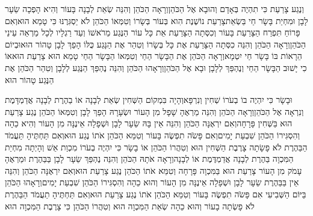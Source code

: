 \documentclass[../main/main.tex]{subfiles}
\begin{document}
\begin{multicols*}{\ncols}
וְנֶגַע\SubEnd{} צָרַעַת כִּי תִהְיֶה בְּאָדָם וְהוּבָא אֶל הַכֹּהֵן\PreVerseSpace{}וְרָאָה הַכֹּהֵן וְהִנֵּה שְׂאֵת לְבָנָה בָּעוֹר וְהִיא הָפְכָה שֵׂעָר לָבָן וּמִחְיַת בָּשָׂר חַי בַּשְׂאֵת\PreVerseSpace{}צָרַעַת נוֹשֶׁנֶת הִוא בְּעוֹר בְּשָׂרוֹ וְטִמְּאוֹ הַכֹּהֵן לֹא יַסְגִּרֶנּוּ כִּי טָמֵא הוּא\PreVerseSpace{}וְאִם פָּרוֹחַ תִּפְרַח הַצָּרַעַת בָּעוֹר וְכִסְּתָה הַצָּרַעַת אֵת כָּל עוֹר הַנֶּגַע מֵרֹאשׁוֹ וְעַד רַגְלָיו לְכָל מַרְאֵה עֵינֵי הַכֹּהֵן\PreVerseSpace{}וְרָאָה הַכֹּהֵן וְהִנֵּה כִסְּתָה הַצָּרַעַת אֶת כָּל בְּשָׂרוֹ וְטִהַר אֶת הַנָּגַע כֻּלּוֹ הָפַךְ לָבָן טָהוֹר הוּא\PreVerseSpace{}וּבְיוֹם הֵרָאוֹת בּוֹ בָּשָׂר חַי יִטְמָא\PreVerseSpace{}וְרָאָה הַכֹּהֵן אֶת הַבָּשָׂר הַחַי וְטִמְּאוֹ הַבָּשָׂר הַחַי טָמֵא הוּא צָרַעַת הוּא\PreVerseSpace{}אוֹ כִי יָשׁוּב הַבָּשָׂר הַחַי וְנֶהְפַּךְ לְלָבָן וּבָא אֶל הַכֹּהֵן\PreVerseSpace{}וְרָאָהוּ הַכֹּהֵן וְהִנֵּה נֶהְפַּךְ הַנֶּגַע לְלָבָן וְטִהַר הַכֹּהֵן אֶת הַנֶּגַע טָהוֹר הוּא\OpenSection{}\par
{}וּבָשָׂר כִּי יִהְיֶה בוֹ בְעֹרוֹ שְׁחִין וְנִרְפָּא\PreVerseSpace{}וְהָיָה בִּמְקוֹם הַשְּׁחִין שְׂאֵת לְבָנָה אוֹ בַהֶרֶת לְבָנָה אֲדַמְדָּמֶת וְנִרְאָה אֶל הַכֹּהֵן\PreVerseSpace{}וְרָאָה הַכֹּהֵן וְהִנֵּה מַרְאֶהָ שָׁפָל מִן הָעוֹר וּשְׂעָרָהּ הָפַךְ לָבָן וְטִמְּאוֹ הַכֹּהֵן נֶגַע צָרַעַת הוּא בַּשְּׁחִין פָּרָחָה\PreVerseSpace{}וְאִם יִרְאֶנָּה הַכֹּהֵן וְהִנֵּה אֵין בָּהּ שֵׂעָר לָבָן וּשְׁפָלָה אֵינֶנָּה מִן הָעוֹר וְהִיא כֵהָה וְהִסְגִּירוֹ הַכֹּהֵן שִׁבְעַת יָמִים\PreVerseSpace{}וְאִם פָּשֹׂה תִפְשֶׂה בָּעוֹר וְטִמֵּא הַכֹּהֵן אֹתוֹ נֶגַע הוּא\PreVerseSpace{}וְאִם תַּחְתֶּיהָ תַּעֲמֹד הַבַּהֶרֶת לֹא פָשָׂתָה צָרֶבֶת הַשְּׁחִין הוּא וְטִהֲרוֹ הַכֹּהֵן \ClosedSection{}אוֹ בָשָׂר כִּי יִהְיֶה בְעֹרוֹ מִכְוַת אֵשׁ וְהָיְתָה מִחְיַת הַמִּכְוָה בַּהֶרֶת לְבָנָה אֲדַמְדֶּמֶת אוֹ לְבָנָה\PreVerseSpace{}וְרָאָה אֹתָהּ הַכֹּהֵן וְהִנֵּה נֶהְפַּךְ שֵׂעָר לָבָן בַּבַּהֶרֶת וּמַרְאֶהָ עָמֹק מִן הָעוֹר צָרַעַת הוּא בַּמִּכְוָה פָּרָחָה וְטִמֵּא אֹתוֹ הַכֹּהֵן נֶגַע צָרַעַת הוּא\PreVerseSpace{}וְאִם יִרְאֶנָּה הַכֹּהֵן וְהִנֵּה אֵין בַּבַּהֶרֶת שֵׂעָר לָבָן וּשְׁפָלָה אֵינֶנָּה מִן הָעוֹר וְהוּא כֵהָה וְהִסְגִּירוֹ הַכֹּהֵן שִׁבְעַת יָמִים\PreVerseSpace{}וְרָאָהוּ הַכֹּהֵן בַּיּוֹם הַשְּׁבִיעִי אִם פָּשֹׂה תִפְשֶׂה בָּעוֹר וְטִמֵּא הַכֹּהֵן אֹתוֹ נֶגַע צָרַעַת הוּא\PreVerseSpace{}וְאִם תַּחְתֶּיהָ תַעֲמֹד הַבַּהֶרֶת לֹא פָשְׂתָה בָעוֹר וְהוּא כֵהָה שְׂאֵת הַמִּכְוָה הוּא וְטִהֲרוֹ הַכֹּהֵן כִּי צָרֶבֶת הַמִּכְוָה הוּא\OpenSection{}\par

\end{multicols*}
\end{document}
